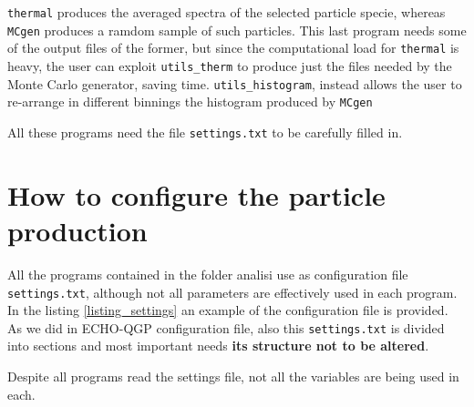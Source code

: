 {\tt thermal} produces the averaged spectra of the selected particle specie, whereas {\tt MCgen} produces a ramdom sample of such particles. This last program needs some of the output files of the former, but since the computational load for {\tt thermal} is heavy, the user can exploit {\tt utils\_therm} to produce just the files needed by the Monte Carlo generator, saving time. {\tt utils\_histogram}, instead allows the user to re-arrange in different binnings the histogram produced by {\tt MCgen}


All these programs need the file {\tt settings.txt} to be carefully filled in. 
\section{How to configure the particle production}
 All the programs contained in the folder analisi
use as configuration file {\tt settings.txt}, although not all parameters are effectively used in each program. In the listing \ref{listing_settings} an example of the configuration file is provided.
As we did in 
ECHO-QGP configuration file, also this {\tt settings.txt} is divided into sections and most important needs \textbf{its structure not to be altered}.


Despite all programs read the settings file, 
not all the variables are being used in each.
